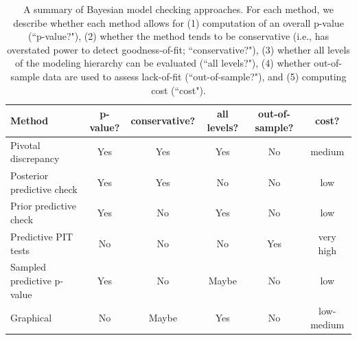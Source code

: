 \documentclass[12pt,english]{article}
\begin{document}
\begin{spacing}{1.9}
    \begin{table}[htp]
      \caption{A summary of Bayesian model checking approaches.  For each method, we describe whether each method allows for (1) computation of an overall p-value (``p-value?"), (2) whether the method tends to be conservative (i.e., has overstated power to detect goodness-of-fit; ``conservative?"), (3) whether all levels of the modeling hierarchy can be evaluated (``all levels?"), (4) whether out-of-sample data are used to assess lack-of-fit (``out-of-sample?"), and (5) computing cost (``cost").
      }
      \label{tab:checks}
      \centering
      \begin{tabular}{lccccc}
        \hline
        Method & p-value? & conservative? & all levels? & out-of-sample?  & cost?\\
        \hline
        Pivotal discrepancy & Yes & Yes & Yes & No & medium \\
        Posterior predictive check & Yes & Yes & No & No & low \\
        Prior predictive check & Yes & No & Yes & No & low \\
        Predictive PIT tests & No & No & No & Yes & very high \\
        Sampled predictive p-value & Yes & No & Maybe & No & low \\
        Graphical & No & Maybe & Yes & No & low-medium \\
        \hline
      \end{tabular}
    \end{table}
    

\end{spacing}
\end{document}
